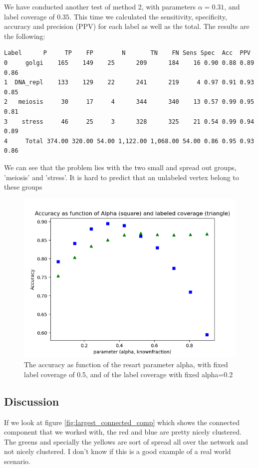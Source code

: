 We have conducted another test of method 2, with parameters $\alpha =
0.31$, and label coverage of $0.35$.
This time we calculated the sensitivity, specificity, accuracy and
precision (PPV) 
for each label as well as the total.
The results are the following:
\begin{lstlisting}[basicstyle=\footnotesize]
      Label      P     TP    FP        N       TN    FN Sens Spec  Acc  PPV
0     golgi    165    149    25      209      184    16 0.90 0.88 0.89 0.86
1  DNA_repl    133    129    22      241      219     4 0.97 0.91 0.93 0.85
2   meiosis     30     17     4      344      340    13 0.57 0.99 0.95 0.81
3    stress     46     25     3      328      325    21 0.54 0.99 0.94 0.89
4     Total 374.00 320.00 54.00 1,122.00 1,068.00 54.00 0.86 0.95 0.93 0.86
\end{lstlisting}
\label{tab:senspec}

We can see that the problem lies with the two small and spread out groups,
'meiosis' and 'stress'. It is hard to predict that an unlabeled vertex belong to these groups 

\begin{figure}
\begin{framed}
\centering
\includegraphics[width=\textwidth]{figures/alpha_fraq_graph.png}
\caption{The accuracy as function of the resart parameter alpha,
with fixed label coverage of 0.5, and of the label coverage with
fixed alpha=0.2}
\label{fig:alpha_fracs}
\end{framed}
\end{figure}

\subsection{Discussion}
If we look at figure \ref{fig:largest_connected_comp} which shows the connected
component that we worked with, the red and blue are pretty nicely clustered. The
greens and specially the yellows are sort of spread all over the network and
not nicely clustered. I don't know if this is a good example of a real world
scenario.

